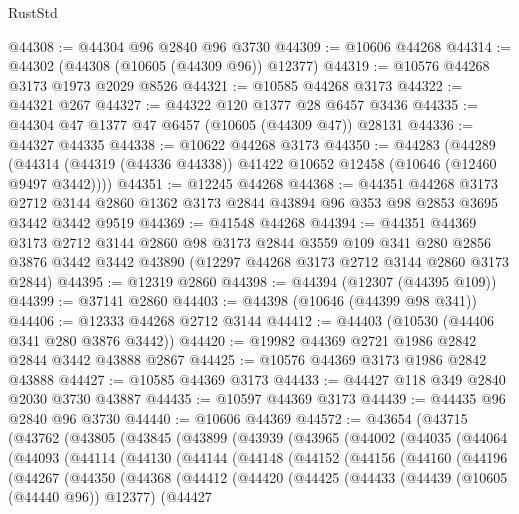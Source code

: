 \begin{lexlean}{RustStd}
\begin{coremodule}
@44308 := @44304 @96 @2840 @96 @3730
@44309 := @10606 @44268
@44314 := @44302 (@44308 (@10605 (@44309 @96)) @12377)
@44319 := @10576 @44268 @3173 @1973 @2029 @8526
@44321 := @10585 @44268 @3173
@44322 := @44321 @267
@44327 := @44322 @120 @1377 @28 @6457 @3436
@44335 := @44304 @47 @1377 @47 @6457 (@10605 (@44309 @47)) @28131
@44336 := @44327 @44335
@44338 := @10622 @44268 @3173
@44350 := @44283
    (@44289 (@44314 (@44319 (@44336 @44338)) @41422 @10652 @12458 (@10646 (@12460 @9497 @3442))))
@44351 := @12245 @44268
@44368 := @44351
    @44268
    @3173
    @2712
    @3144
    @2860
    @1362
    @3173
    @2844
    @43894
    @96
    @353
    @98
    @2853
    @3695
    @3442
    @3442
    @9519
@44369 := @41548 @44268
@44394 := @44351
    @44369
    @3173
    @2712
    @3144
    @2860
    @98
    @3173
    @2844
    @3559
    @109
    @341
    @280
    @2856
    @3876
    @3442
    @3442
    @43890
    (@12297 @44268 @3173 @2712 @3144 @2860 @3173 @2844)
@44395 := @12319 @2860
@44398 := @44394 (@12307 (@44395 @109))
@44399 := @37141 @2860
@44403 := @44398 (@10646 (@44399 @98 @341))
@44406 := @12333 @44268 @2712 @3144
@44412 := @44403 (@10530 (@44406 @341 @280 @3876 @3442))
@44420 := @19982 @44369 @2721 @1986 @2842 @2844 @3442 @43888 @2867
@44425 := @10576 @44369 @3173 @1986 @2842 @43888
@44427 := @10585 @44369 @3173
@44433 := @44427 @118 @349 @2840 @2030 @3730 @43887
@44435 := @10597 @44369 @3173
@44439 := @44435 @96 @2840 @96 @3730
@44440 := @10606 @44369
@44572 := @43654
    (@43715
      (@43762
        (@43805
          (@43845
            (@43899
              (@43939
                (@43965
                  (@44002
                    (@44035
                      (@44064
                        (@44093
                          (@44114
                            (@44130
                              (@44144
                                (@44148
                                  (@44152
                                    (@44156
                                      (@44160
                                        (@44196
                                          (@44267
                                            (@44350
                                              (@44368
                                                (@44412
                                                  (@44420
                                                    (@44425
                                                      (@44433
                                                        (@44439 (@10605 (@44440 @96)) @12377)
                                                        (@44427

\end{coremodule}
\end{lexlean}
